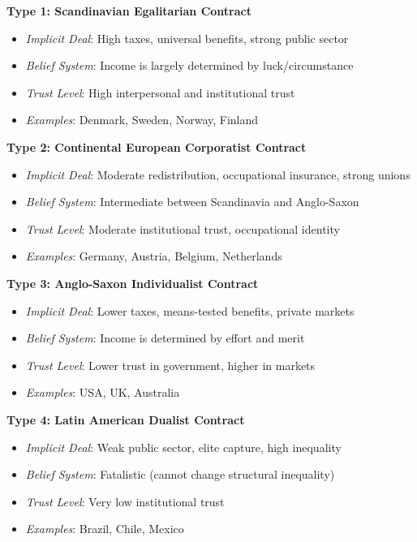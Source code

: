 \begin{tcolorbox}[colback=green!5!white, colframe=green!75!black,
    title=Alesina's Social Contracts]

\textbf{Type 1: Scandinavian Egalitarian Contract}
\begin{itemize}[nosep]
\item \textit{Implicit Deal}: High taxes, universal benefits, strong public sector
\item \textit{Belief System}: Income is largely determined by luck/circumstance
\item \textit{Trust Level}: High interpersonal and institutional trust
\item \textit{Examples}: Denmark, Sweden, Norway, Finland
\end{itemize}

\textbf{Type 2: Continental European Corporatist Contract}
\begin{itemize}[nosep]
\item \textit{Implicit Deal}: Moderate redistribution, occupational insurance, strong unions
\item \textit{Belief System}: Intermediate between Scandinavia and Anglo-Saxon
\item \textit{Trust Level}: Moderate institutional trust, occupational identity
\item \textit{Examples}: Germany, Austria, Belgium, Netherlands
\end{itemize}

\textbf{Type 3: Anglo-Saxon Individualist Contract}
\begin{itemize}[nosep]
\item \textit{Implicit Deal}: Lower taxes, means-tested benefits, private markets
\item \textit{Belief System}: Income is determined by effort and merit
\item \textit{Trust Level}: Lower trust in government, higher in markets
\item \textit{Examples}: USA, UK, Australia
\end{itemize}

\textbf{Type 4: Latin American Dualist Contract}
\begin{itemize}[nosep]
\item \textit{Implicit Deal}: Weak public sector, elite capture, high inequality
\item \textit{Belief System}: Fatalistic (cannot change structural inequality)
\item \textit{Trust Level}: Very low institutional trust
\item \textit{Examples}: Brazil, Chile, Mexico
\end{itemize}

\end{tcolorbox}

